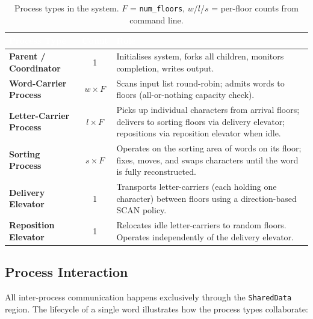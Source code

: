 \documentclass[12pt,a4paper]{article}
\newcommand{\code}[1]{\texttt{\small #1}}
\begin{document}
\begin{table}[htbp]
\centering
\caption{Process types in the system. $F$ = \texttt{num\_floors},
         $w$/$l$/$s$ = per-floor counts from command line.}
\begin{tabularx}{\textwidth}{>{\bfseries}l c X}
\toprule
\rowcolor{darkblue}
\textcolor{white}{Process Type} &
\textcolor{white}{Count} &
\textcolor{white}{Role} \\
\midrule
Parent / Coordinator & 1 &
  Initialises system, forks all children, monitors completion, writes output. \\
\rowcolor{rowgray}
Word-Carrier Process & $w \times F$ &
  Scans input list round-robin; admits words to floors (all-or-nothing
  capacity check). \\
Letter-Carrier Process & $l \times F$ &
  Picks up individual characters from arrival floors; delivers to sorting
  floors via delivery elevator; repositions via reposition elevator when idle. \\
\rowcolor{rowgray}
Sorting Process & $s \times F$ &
  Operates on the sorting area of words on its floor; fixes, moves, and
  swaps characters until the word is fully reconstructed. \\
Delivery Elevator & 1 &
  Transports letter-carriers (each holding one character) between floors
  using a direction-based SCAN policy. \\
\rowcolor{rowgray}
Reposition Elevator & 1 &
  Relocates idle letter-carriers to random floors. Operates independently
  of the delivery elevator. \\
\bottomrule
\end{tabularx}
\end{table}

\subsection{Process Interaction}

All inter-process communication happens exclusively through the \code{SharedData}
region. The lifecycle of a single word illustrates how the process types
collaborate:
\end{document}
